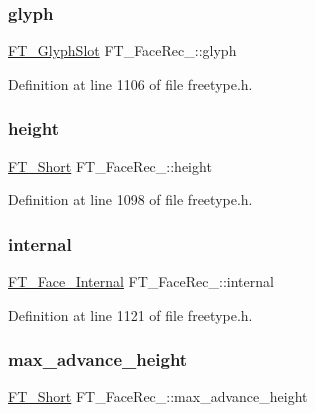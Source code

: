 \subsubsection{\texorpdfstring{glyph}{glyph}}
{\footnotesize\ttfamily \mbox{\hyperlink{freetype_8h_a768daa0d9c3fa499e6c37034ee9f2ca3}{F\+T\+\_\+\+Glyph\+Slot}} F\+T\+\_\+\+Face\+Rec\+\_\+\+::glyph}



Definition at line 1106 of file freetype.\+h.

\mbox{\label{struct_f_t___face_rec___a6062881a848ab3395c6d096812065d9d}} 
\subsubsection{\texorpdfstring{height}{height}}
{\footnotesize\ttfamily \mbox{\hyperlink{fttypes_8h_aa7279be89046a2563cd3d4d6651fbdcf}{F\+T\+\_\+\+Short}} F\+T\+\_\+\+Face\+Rec\+\_\+\+::height}



Definition at line 1098 of file freetype.\+h.

\mbox{\label{struct_f_t___face_rec___aed9a1267cddcbe790f0591471c886537}} 
\subsubsection{\texorpdfstring{internal}{internal}}
{\footnotesize\ttfamily \mbox{\hyperlink{freetype_8h_a1b0af221e2e374269fa3dc687a1e4023}{F\+T\+\_\+\+Face\+\_\+\+Internal}} F\+T\+\_\+\+Face\+Rec\+\_\+\+::internal}



Definition at line 1121 of file freetype.\+h.

\mbox{\label{struct_f_t___face_rec___abb74c1e75fb9138261c106e01bd08d69}} 
\subsubsection{\texorpdfstring{max\_advance\_height}{max\_advance\_height}}
{\footnotesize\ttfamily \mbox{\hyperlink{fttypes_8h_aa7279be89046a2563cd3d4d6651fbdcf}{F\+T\+\_\+\+Short}} F\+T\+\_\+\+Face\+Rec\+\_\+\+::max\+\_\+advance\+\_\+height}



